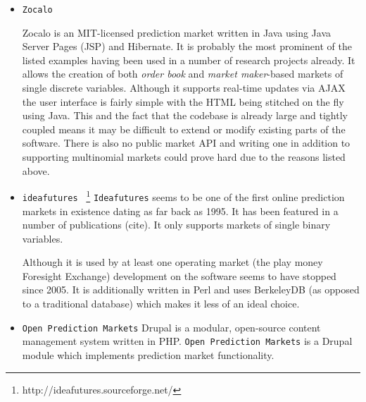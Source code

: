 \documentclass[bsc,frontabs,twoside,singlespacing,parskip,deptreport]{infthesis}     %
\begin{document}
\begin{itemize}
\item {\tt Zocalo}

	Zocalo is an MIT-licensed prediction market written in Java using Java Server Pages (JSP) and Hibernate. It is probably the most prominent of the listed examples having been used in a number of research projects already. It allows the creation of both {\em order book} and {\em market maker}-based markets of single discrete variables. Although it supports real-time updates via AJAX the user interface is fairly simple with the HTML being stitched on the fly using Java. This and the fact that the codebase is already large and tightly coupled means it may be difficult to extend or modify existing parts of the software. There is also no public market API and writing one in addition to supporting multinomial markets could prove hard due to the reasons listed above. 

\item {\tt ideafutures } \footnote{http://ideafutures.sourceforge.net/}
	{\tt Ideafutures} seems to be one of the first online prediction markets in existence dating as far back as 1995. It has been featured in a number of publications (cite). It only supports markets of single binary variables. 

Although it is used by at least one operating market (the play money Foresight Exchange) development on the software seems to have stopped since 2005. It is additionally written in Perl and uses BerkeleyDB (as opposed to a traditional database) which makes it less of an ideal choice. 

\item {\tt Open Prediction Markets} 
	Drupal is a modular, open-source content management system written in PHP. {\tt Open Prediction Markets} is a Drupal module which implements prediction market functionality. 
\end{itemize}

\end{document}
